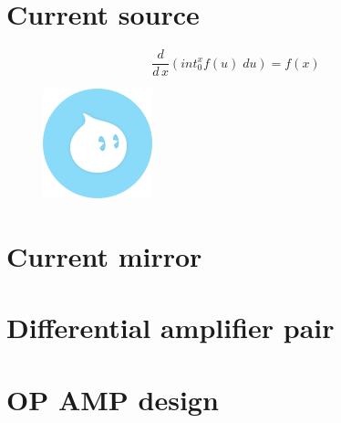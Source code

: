 \chapter{Current source}
\label{Current source}

\[
	\frac{d}{d\,x}\left(int_0^x f(u)\;d u\right) = f(x)
\]

\begin{figure}
	\centering
	\includegraphics[width=0.7\linewidth, height=0.5\textheight]{images/0.jpg}
	\caption{}
	\label{fig:0}
\end{figure}


\chapter{Current mirror}
\label{Current mirror }

\chapter{Differential amplifier pair}
\label{Differential amplifier pair}

\chapter{OP AMP design}
\label{OP AMP design}